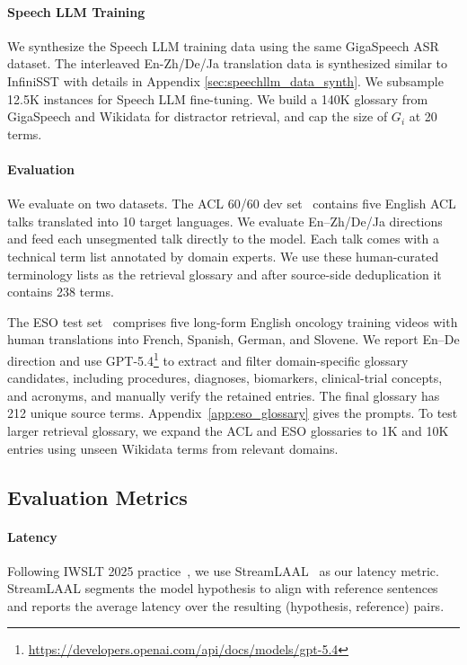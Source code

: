 \paragraph{Speech LLM Training}
We synthesize the Speech LLM training data using the same GigaSpeech ASR dataset. The interleaved En-Zh/De/Ja translation data is synthesized similar to InfiniSST with details in Appendix \ref{sec:speechllm_data_synth}. 
We subsample 12.5K instances for Speech LLM fine-tuning. We build a 140K glossary from GigaSpeech and Wikidata for distractor retrieval, and cap the size of $G_i$ at 20 terms.

\paragraph{Evaluation} We evaluate on two datasets. The ACL 60/60 dev set~\citep{salesky-etal-2023-evaluating} contains five English ACL talks translated into 10 target languages. We evaluate En--Zh/De/Ja directions and feed each unsegmented talk directly to the model. Each talk comes with a technical term list annotated by domain experts. We use these human-curated terminology lists as the retrieval glossary and after source-side deduplication it contains 238 terms.

The ESO test set~\citep{eso_dataset} comprises five long-form English oncology training videos with human translations into French, Spanish, German, and Slovene. We report En--De direction and use GPT-5.4\footnote{\url{https://developers.openai.com/api/docs/models/gpt-5.4}} to extract and filter domain-specific glossary candidates, including procedures, diagnoses, biomarkers, clinical-trial concepts, and acronyms, and manually verify the retained entries. The final glossary has 212 unique source terms. Appendix~\ref{app:eso_glossary} gives the prompts. To test larger retrieval glossary, we expand the ACL and ESO glossaries to 1K and 10K entries using unseen Wikidata terms from relevant domains.

\subsection{Evaluation Metrics}
\label{sec:evaluation}

\paragraph{Latency}
Following IWSLT 2025 practice~\citep{agostinelli-etal-2025-findings}, we use StreamLAAL~\citep{papi-etal-2024-streamatt} as our latency metric. StreamLAAL segments the model hypothesis to align with reference sentences and reports the average latency over the resulting (hypothesis, reference) pairs.

